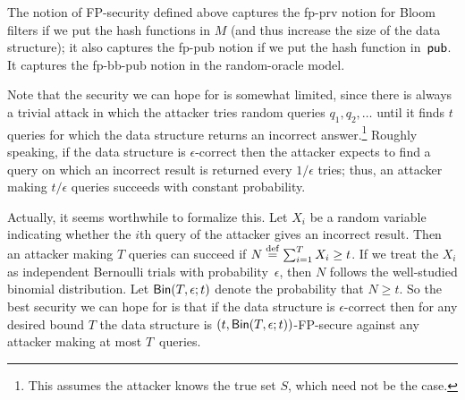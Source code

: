 The notion of FP-security defined above captures the fp-prv notion for Bloom filters
if we put the hash
functions in $M$ (and thus increase the size of the data structure); it also captures the fp-pub
notion if we put the hash function in~${\sf pub}$.  It captures the fp-bb-pub notion in the
random-oracle model. 

Note that the security we can hope for is somewhat limited, since there
is always a trivial attack in which
the attacker tries random queries $q_1, q_2, \ldots$ until it finds $t$ queries for which the
data structure returns an incorrect answer.\footnote{This assumes the attacker
knows the true set $S$, which need not be the case.} Roughly speaking,
if the data structure is $\epsilon$-correct then the attacker expects to find a query on which
an incorrect result is returned
every $1/\epsilon$ tries; thus, an
attacker making $t/\epsilon$ queries succeeds with constant probability.

\def\bin{{\sf Bin}}

Actually, it seems worthwhile to formalize this. Let $X_i$ be a random variable indicating
whether the $i$th query of the attacker gives an incorrect result. Then an attacker making $T$
queries can succeed
if $N \stackrel{{\rm def}}{=} \sum_{i=1}^T X_i \geq t$. If we treat the $X_i$ as independent Bernoulli trials with
probability~$\epsilon$, then $N$ follows the well-studied binomial distribution.
Let $\bin(T, \epsilon; t)$ denote the probability that $N \geq t$. So the best security we can
hope for
is that if the data structure is $\epsilon$-correct then for any desired bound $T$
the data structure is $(t, \bin(T,\epsilon; t))$-FP-secure against any attacker making
at most $T$~queries. 


